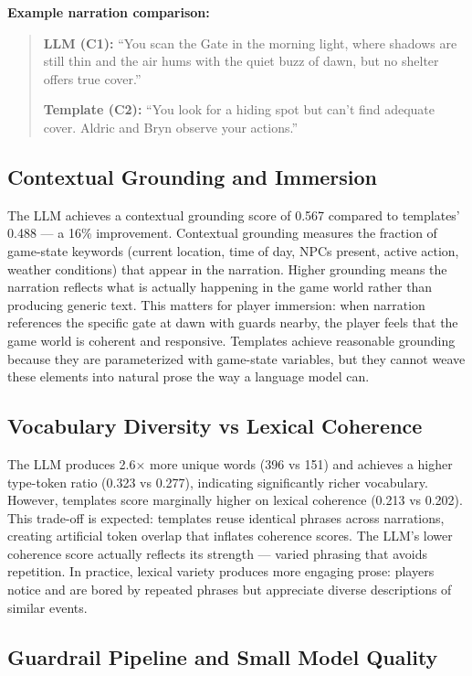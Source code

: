 \documentclass[12pt, a4paper, oneside]{report}
\begin{document}
\textbf{Example narration comparison:}

\begin{quote}
\textbf{LLM (C1):} ``You scan the Gate in the morning light, where shadows are still thin and the air hums with the quiet buzz of dawn, but no shelter offers true cover.''

\textbf{Template (C2):} ``You look for a hiding spot but can't find adequate cover. Aldric and Bryn observe your actions.''
\end{quote}

\subsection{Contextual Grounding and Immersion}

The LLM achieves a contextual grounding score of 0.567 compared to templates' 0.488 --- a 16\% improvement. Contextual grounding measures the fraction of game-state keywords (current location, time of day, NPCs present, active action, weather conditions) that appear in the narration. Higher grounding means the narration reflects what is actually happening in the game world rather than producing generic text. This matters for player immersion: when narration references the specific gate at dawn with guards nearby, the player feels that the game world is coherent and responsive. Templates achieve reasonable grounding because they are parameterized with game-state variables, but they cannot weave these elements into natural prose the way a language model can.

\subsection{Vocabulary Diversity vs Lexical Coherence}

The LLM produces 2.6$\times$ more unique words (396 vs 151) and achieves a higher type-token ratio (0.323 vs 0.277), indicating significantly richer vocabulary. However, templates score marginally higher on lexical coherence (0.213 vs 0.202). This trade-off is expected: templates reuse identical phrases across narrations, creating artificial token overlap that inflates coherence scores. The LLM's lower coherence score actually reflects its strength --- varied phrasing that avoids repetition. In practice, lexical variety produces more engaging prose: players notice and are bored by repeated phrases but appreciate diverse descriptions of similar events.

\subsection{Guardrail Pipeline and Small Model Quality}
\end{document}
